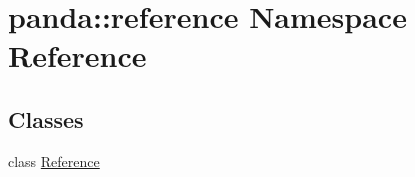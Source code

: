 \hypertarget{namespacepanda_1_1reference}{
\section{panda::reference Namespace Reference}
\label{namespacepanda_1_1reference}
}
\subsection*{Classes}
\begin{DoxyCompactItemize}
\item 
class \hyperlink{classpanda_1_1reference_1_1Reference}{Reference}
\end{DoxyCompactItemize}
